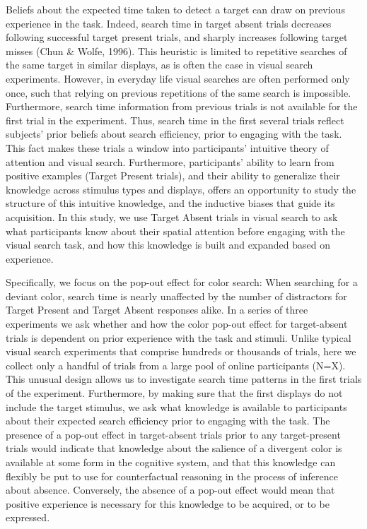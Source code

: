 \documentclass[
  english,
  man]{apa6}
\begin{document}
Beliefs about the expected time taken to detect a target can draw on previous experience in the task. Indeed, search time in target absent trials decreases following successful target present trials, and sharply increases following target misses (Chun \& Wolfe, 1996). This heuristic is limited to repetitive searches of the same target in similar displays, as is often the case in visual search experiments. However, in everyday life visual searches are often performed only once, such that relying on previous repetitions of the same search is impossible. Furthermore, search time information from previous trials is not available for the first trial in the experiment. Thus, search time in the first several trials reflect subjects' prior beliefs about search efficiency, prior to engaging with the task. This fact makes these trials a window into participants' intuitive theory of attention and visual search. Furthermore, participants' ability to learn from positive examples (Target Present trials), and their ability to generalize their knowledge across stimulus types and displays, offers an opportunity to study the structure of this intuitive knowledge, and the inductive biases that guide its acquisition. In this study, we use Target Absent trials in visual search to ask what participants know about their spatial attention before engaging with the visual search task, and how this knowledge is built and expanded based on experience.

Specifically, we focus on the pop-out effect for color search: When searching for a deviant color, search time is nearly unaffected by the number of distractors for Target Present and Target Absent responses alike. In a series of three experiments we ask whether and how the color pop-out effect for target-absent trials is dependent on prior experience with the task and stimuli. Unlike typical visual search experiments that comprise hundreds or thousands of trials, here we collect only a handful of trials from a large pool of online participants (N=X). This unusual design allows us to investigate search time patterns in the first trials of the experiment. Furthermore, by making sure that the first displays do not include the target stimulus, we ask what knowledge is available to participants about their expected search efficiency prior to engaging with the task. The presence of a pop-out effect in target-absent trials prior to any target-present trials would indicate that knowledge about the salience of a divergent color is available at some form in the cognitive system, and that this knowledge can flexibly be put to use for counterfactual reasoning in the process of inference about absence. Conversely, the absence of a pop-out effect would mean that positive experience is necessary for this knowledge to be acquired, or to be expressed.
\end{document}
